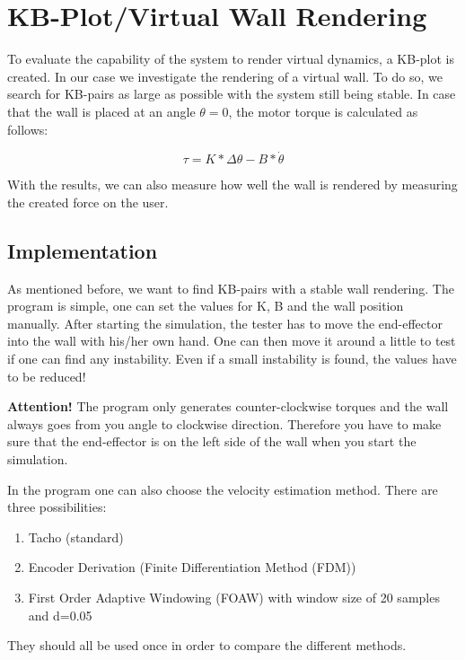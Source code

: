 \section{KB-Plot/Virtual Wall Rendering}

To evaluate the capability of the system to render virtual dynamics, a KB-plot is created. In our case we investigate the rendering of a virtual wall. To do so, we search for KB-pairs as large as possible with the system still being stable. In case that the wall is placed at an angle $\theta = 0$, the motor torque is calculated as follows:

\begin{equation}
    \tau = K*\Delta\theta - B*\dot{\theta}
\end{equation}

With the results, we can also measure how well the wall is rendered by measuring the created force on the user.

\subsection{Implementation}

As mentioned before, we want to find KB-pairs with a stable wall rendering. The program is simple, one can set the values for K, B and the wall position manually. After starting the simulation, the tester has to move the end-effector into the wall with his/her own hand. One can then move it around a little to test if one can find any instability. Even if a small instability is found, the values have to be reduced!

\textbf{Attention!} The program only generates counter-clockwise torques and the wall always goes from you angle to clockwise direction. Therefore you have to make sure that the end-effector is on the left side of the wall when you start the simulation.

In the program one can also choose the velocity estimation method. There are three possibilities: 

\begin{enumerate}
    \item Tacho (standard)
    \item Encoder Derivation (Finite Differentiation Method (FDM))
    \item First Order Adaptive Windowing (FOAW) with window size of 20 samples and d=0.05
\end{enumerate}

They should all be used once in order to compare the different methods.


